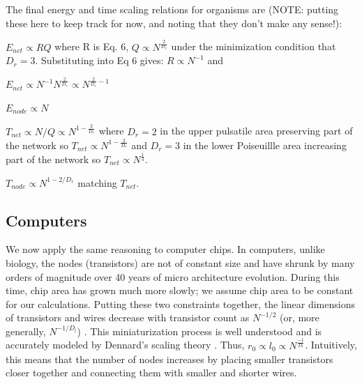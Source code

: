 \documentclass[12pt]{article}
\begin{document}
The final energy and time scaling relations for organisms are  (NOTE:  putting
these here to keep track for now, and noting that they don't make any sense!):

$E_{net} \propto RQ$ where R is Eq. 6,  $Q \propto N^{\frac{2}{D_r}}$ under the minimization condition that $D_r = 3$.
Substituting into Eq 6 gives: $R \propto N^{-1}$ and

$E_{net} \propto N^{-1} N^{\frac{2}{D_r}} \propto N^{\frac{2}{D_r} -1} $

$E_{node} \propto N$ %

$T_{net} \propto N/Q \propto N^{1-\frac{2}{D_r}}$ where $D_r = 2$ in the upper
pulsatile area preserving part of the network so $T_{net} \propto
N^{1-\frac{2}{D_r}} $ and $D_r = 3$ in the lower Poiseuillle area increasing
part of the network so $T_{net} \propto N^{\frac{1}{3}}$.

$T_{node} \propto N^{1-2/D_r}$ matching $T_{net}$. 



\subsection{Computers}
\label{sec:computers}

We now apply the same reasoning to computer chips. 
In computers, unlike biology, the nodes (transistors) 
are not of constant size and have shrunk by many orders of magnitude over 40
years of micro architecture evolution.  During this time, chip area has grown
much more slowly; we assume chip area to be constant for our calculations.
Putting these two constraints together, the linear dimensions of transistors
and wires decrease with transistor count as $N^{-1/2}$ (or, more generally,
$N^{-1/D_l}$) \cite{moses08}.  This miniaturization process is well understood
and is accurately modeled by Dennard's scaling theory \cite{dennard74}.  
Thus, $r_0 \propto l_0 \propto N^{\frac{-1}{D_l}}$. Intuitively, this means
that the number of nodes increases by placing smaller transistors closer
together and connecting them with smaller and shorter wires.
\end{document}
